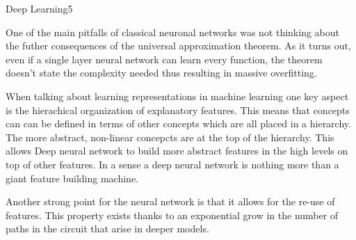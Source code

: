 \begin{questions}
\begin{question}[bonus]{Deep Learning}{5}
\begin{answer}
One of the main pitfalls of classical neuronal networks was not thinking about the futher consequences of the universal approximation theorem. As it turns out, even if a single layer neural network can learn every function, the theorem doesn't state the complexity needed thus resulting in massive overfitting. 

When talking about learning representations in machine learning one key aspect is the hierachical organization of explanatory features. This means that concepts can can be defined in terms of other concepts which are all placed in a hierarchy. The more abstract, non-linear concepcts are at the top of the hierarchy. This allows Deep neural network to build more abstract features in the high levels on top of other features. In a sense a deep neural network is nothing more than a giant feature building machine. 

Another strong point for the neural network is that it allows for the re-use of features. This property exists thanks to an exponential grow in the number of paths in the circuit that arise in deeper models. 


\end{answer}

\end{question}


\end{questions}
